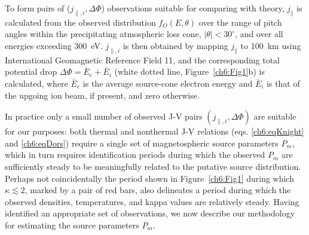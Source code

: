 




  To form pairs of ($j_{\parallel,i}, \Delta \Phi$) observations
  suitable for comparing with theory, $j_\parallel$ is calculated from
  the observed distribution $f_O ( E, \theta )$ over the range of
  pitch angles within the precipitating atmospheric loss cone, $\vert
  \theta \vert < 30^\circ$, and over all energies exceeding 300~eV.
  $j_{\parallel,i}$ is then obtained by mapping $j_\parallel$ to
  100~km using International Geomagnetic Reference Field 11, and the
  corresponding total potential drop $\Delta \Phi = \bar{E}_e +
  \bar{E}_i$ (white dotted line, Figure~\ref{ch6:Fig1}b) is calculated,
  where $\bar{E}_e$ is the average source-cone electron energy and
  $\bar{E}_i$ is that of the upgoing ion beam, if present, and zero
  otherwise.

  In practice only a small number of observed J-V pairs $(
  j_{\parallel,i} , \Delta \Phi )$ are suitable for our purposes: both
  thermal and nonthermal J-V relations (eqs. \ref{ch6:eqKnight} and
  \ref{ch6:eqDors}) require a single set of magnetospheric source
  parameters $P_m$, which in turn requires identification periods
  during which the observed $P_m$ are sufficiently steady to be
  meaningfully related to the putative source distribution. Perhaps
  not coincidentally the period shown in Figure~\ref{ch6:Fig1} during
  which $\kappa \lesssim 2$, marked by a pair of red bars, also
  delineates a period during which the observed densities,
  temperatures, and kappa values are relatively steady. Having
  identified an appropriate set of observations, we now describe our
  methodology for estimating the source parameters $P_m$.

